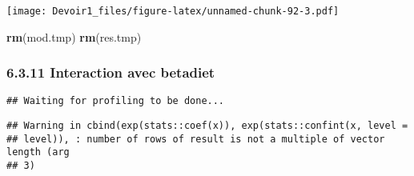\documentclass[]{article}
\newenvironment{Shaded}{\begin{snugshade}}{\end{snugshade}}
\newcommand{\KeywordTok}[1]{\textcolor[rgb]{0.13,0.29,0.53}{\textbf{#1}}}
\newcommand{\DataTypeTok}[1]{\textcolor[rgb]{0.13,0.29,0.53}{#1}}
\newcommand{\DecValTok}[1]{\textcolor[rgb]{0.00,0.00,0.81}{#1}}
\newcommand{\StringTok}[1]{\textcolor[rgb]{0.31,0.60,0.02}{#1}}
\newcommand{\OperatorTok}[1]{\textcolor[rgb]{0.81,0.36,0.00}{\textbf{#1}}}
\newcommand{\NormalTok}[1]{#1}
\begin{document}
\texttt{[image: Devoir1\_files/figure-latex/unnamed-chunk-92-3.pdf]}

\begin{Shaded}
\begin{Highlighting}[]
\KeywordTok{rm}\NormalTok{(mod.tmp)}
\KeywordTok{rm}\NormalTok{(res.tmp)}
\end{Highlighting}
\end{Shaded}

\subsubsection{6.3.11 Interaction avec
betadiet}\label{interaction-avec-betadiet}

\begin{Shaded}
\end{Shaded}

\begin{verbatim}
## Waiting for profiling to be done...
\end{verbatim}

\begin{verbatim}
## Warning in cbind(exp(stats::coef(x)), exp(stats::confint(x, level =
## level)), : number of rows of result is not a multiple of vector length (arg
## 3)
\end{verbatim}
\end{document}
